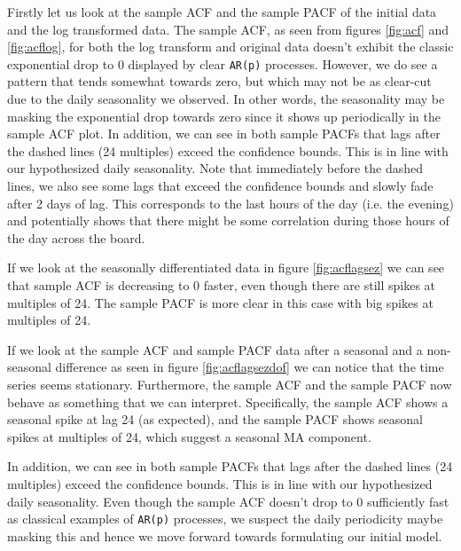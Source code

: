 \documentclass{article}
\begin{document}
Firstly let us look at the sample ACF and the sample PACF of the initial data and the log transformed data. The sample ACF, as seen from figures \ref{fig:acf} and \ref{fig:acflog}, for both the log transform and original data doesn’t exhibit the classic exponential drop to 0 displayed by clear \verb|AR(p)| processes. However, we do see a pattern that tends somewhat towards zero, but which may not be as clear-cut due to the daily seasonality we observed. In other words, the seasonality may be masking the exponential drop towards zero since
it shows up periodically in the sample ACF plot. 
In addition, we can see in both
sample PACFs that lags after the dashed lines (24 multiples) exceed the confidence bounds. This is in line
with our hypothesized daily seasonality. Note that immediately before the dashed lines, we also see
some lags that exceed the confidence bounds and slowly fade after 2 days of lag. This corresponds to the
last hours of the day (i.e. the evening) and potentially shows that there might be some correlation during those hours of the day across the board. 

If we look at the seasonally differentiated data in figure \ref{fig:acflagsez} we can see that sample ACF is decreasing to 0
faster, even though there are still spikes at multiples of 24. The sample PACF is more clear in this case with big spikes at multiples of 24.

If we look at the sample ACF and sample PACF data after a seasonal and a non-seasonal difference as seen in figure \ref{fig:acflagsezdof} we can notice that the time series seems stationary. Furthermore, the sample ACF and the sample PACF now behave as something that we can interpret. Specifically, the sample ACF shows a seasonal spike at lag 24 (as expected), and the sample PACF shows seasonal spikes at multiples of 24, which suggest a seasonal MA component.

In addition, we can see in both sample PACFs that lags after the dashed lines (24 multiples) exceed the confidence bounds. This is in line with our hypothesized daily seasonality. Even though the sample ACF doesn’t drop to 0 sufficiently fast as classical examples of \verb|AR(p)| processes, we suspect the daily periodicity maybe masking this and hence we move forward towards formulating our initial model.
\end{document}
